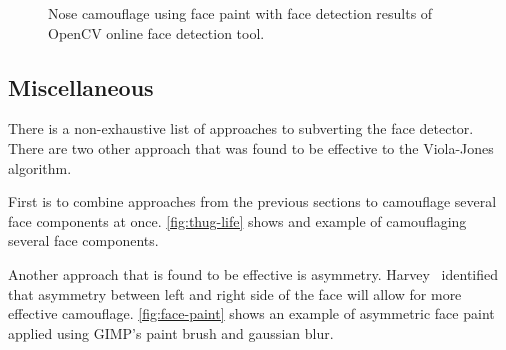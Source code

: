 \documentclass[10pt,twocolumn,letterpaper]{article}
\begin{document}
\begin{figure}[t]
    \caption{Nose camouflage using face paint with face detection results of OpenCV online face detection tool.}
    \label{fig:nose}
\end{figure}


\subsection{Miscellaneous} \label{sec:miscellaneous}

There is a non-exhaustive list of approaches to subverting the face detector. There are two other approach that was found to be effective to the Viola-Jones algorithm.

First is to combine approaches from the previous sections to camouflage several face components at once. \cref{fig:thug-life} shows and example of camouflaging several face components.

Another approach that is found to be effective is asymmetry. Harvey~\cite{cvdazzle} identified that asymmetry between left and right side of the face will allow for more effective camouflage. \cref{fig:face-paint} shows an example of asymmetric face paint applied using GIMP's paint brush and gaussian blur.
\end{document}
